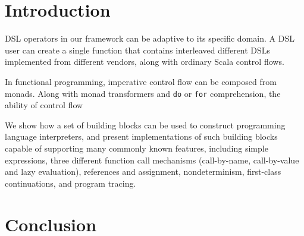 \section{Introduction}
\label{introduction}





DSL operators in our framework can be adaptive to its specific domain. A DSL user can create a single function that contains interleaved different DSLs implemented from different vendors, along with ordinary Scala control flows.

 
In functional programming, imperative control flow can be composed from monads\cite{wadler1990comprehending,wadler1992essence,jones1993composing}.
Along with monad transformers\cite{liang1995monad} and \lstinline{do} or \lstinline{for} comprehension\cite{jones1998haskell,odersky2004scala}, the ability of control flow

We show how a set of building blocks can be used to construct
programming language interpreters, and present implementations
of such building blocks capable of supporting many
commonly known features, including simple expressions,
three different function call mechanisms (call-by-name, call-by-value and lazy evaluation), references and assignment,
nondeterminism, first-class continuations, and program tracing.


\section{Conclusion}
\label{conclusion}


\clearpage
\appendix

\printglossary

\begin{acks}
\end{acks}


